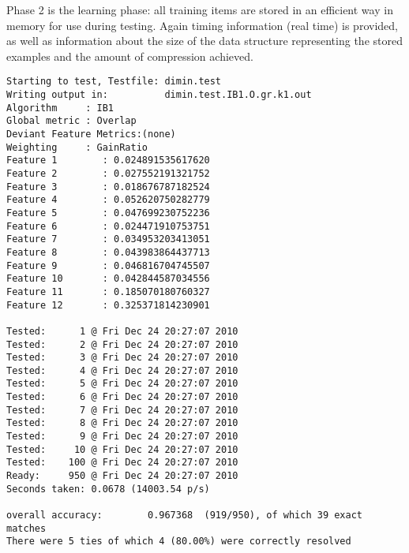 \documentclass{book}
\begin{document}

Phase 2 is the learning phase: all training items are stored in an
efficient way in memory for use during testing. Again timing
information (real time) is provided, as well as information about the
size of the data structure representing the stored examples and the
amount of compression achieved. 



{\footnotesize
\begin{verbatim}
Starting to test, Testfile: dimin.test
Writing output in:          dimin.test.IB1.O.gr.k1.out
Algorithm     : IB1
Global metric : Overlap
Deviant Feature Metrics:(none)
Weighting     : GainRatio
Feature 1        : 0.024891535617620
Feature 2        : 0.027552191321752
Feature 3        : 0.018676787182524
Feature 4        : 0.052620750282779
Feature 5        : 0.047699230752236
Feature 6        : 0.024471910753751
Feature 7        : 0.034953203413051
Feature 8        : 0.043983864437713
Feature 9        : 0.046816704745507
Feature 10       : 0.042844587034556
Feature 11       : 0.185070180760327
Feature 12       : 0.325371814230901

Tested:      1 @ Fri Dec 24 20:27:07 2010
Tested:      2 @ Fri Dec 24 20:27:07 2010
Tested:      3 @ Fri Dec 24 20:27:07 2010
Tested:      4 @ Fri Dec 24 20:27:07 2010
Tested:      5 @ Fri Dec 24 20:27:07 2010
Tested:      6 @ Fri Dec 24 20:27:07 2010
Tested:      7 @ Fri Dec 24 20:27:07 2010
Tested:      8 @ Fri Dec 24 20:27:07 2010
Tested:      9 @ Fri Dec 24 20:27:07 2010
Tested:     10 @ Fri Dec 24 20:27:07 2010
Tested:    100 @ Fri Dec 24 20:27:07 2010
Ready:     950 @ Fri Dec 24 20:27:07 2010
Seconds taken: 0.0678 (14003.54 p/s)

overall accuracy:        0.967368  (919/950), of which 39 exact matches 
There were 5 ties of which 4 (80.00%) were correctly resolved
\end{verbatim}
}


\end{document}
